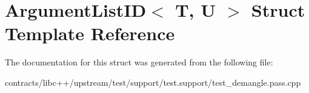 \hypertarget{struct_argument_list_i_d}{}\section{Argument\+List\+ID$<$ T, U $>$ Struct Template Reference}
\label{struct_argument_list_i_d}


The documentation for this struct was generated from the following file\+:\begin{DoxyCompactItemize}
\item 
contracts/libc++/upstream/test/support/test.\+support/test\+\_\+demangle.\+pass.\+cpp\end{DoxyCompactItemize}
